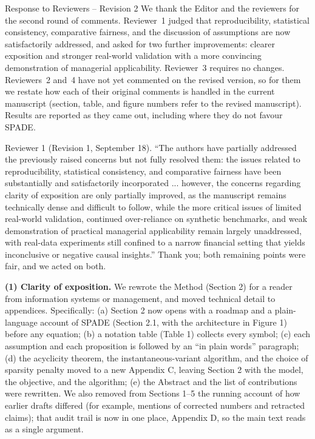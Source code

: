 Response to Reviewers -- Revision 2
We thank the Editor and the reviewers for the second round of comments. Reviewer~1 judged that reproducibility, statistical consistency, comparative fairness, and the discussion of assumptions are now satisfactorily addressed, and asked for two further improvements: clearer exposition and stronger real-world validation with a more convincing demonstration of managerial applicability. Reviewer~3 requires no changes. Reviewers~2 and~4 have not yet commented on the revised version, so for them we restate how each of their original comments is handled in the current manuscript (section, table, and figure numbers refer to the revised manuscript). Results are reported as they came out, including where they do not favour SPADE.
\item[R1] Reviewer 1 (Revision 1, September 18). ``The authors have partially addressed the previously raised concerns but not fully resolved them: the issues related to reproducibility, statistical consistency, and comparative fairness have been substantially and satisfactorily incorporated ... however, the concerns regarding clarity of exposition are only partially improved, as the manuscript remains technically dense and difficult to follow, while the more critical issues of limited real-world validation, continued over-reliance on synthetic benchmarks, and weak demonstration of practical managerial applicability remain largely unaddressed, with real-data experiments still confined to a narrow financial setting that yields inconclusive or negative causal insights.''
Thank you; both remaining points were fair, and we acted on both.

\textbf{(1) Clarity of exposition.} We rewrote the Method (Section 2) for a reader from information systems or management, and moved technical detail to appendices. Specifically: (a) Section 2 now opens with a roadmap and a plain-language account of SPADE (Section 2.1, with the architecture in Figure 1) before any equation; (b) a notation table (Table 1) collects every symbol; (c) each assumption and each proposition is followed by an ``in plain words'' paragraph; (d) the acyclicity theorem, the instantaneous-variant algorithm, and the choice of sparsity penalty moved to a new Appendix C, leaving Section 2 with the model, the objective, and the algorithm; (e) the Abstract and the list of contributions were rewritten. We also removed from Sections 1--5 the running account of how earlier drafts differed (for example, mentions of corrected numbers and retracted claims); that audit trail is now in one place, Appendix D, so the main text reads as a single argument.

